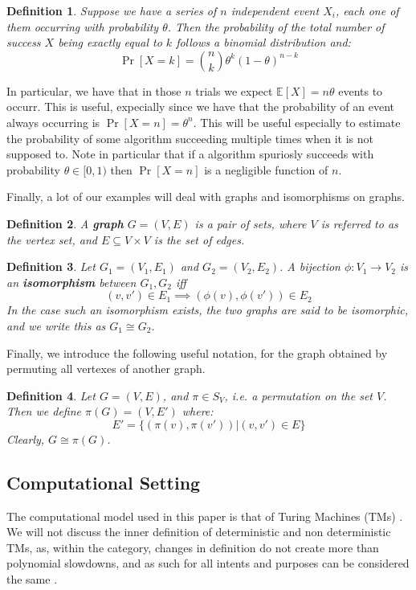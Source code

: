 \documentclass{article}
\newtheorem{definition}{Definition}
\begin{document}
\begin{definition}
    Suppose we have a series of $n$ independent event $X_i$, each one of them 
    occurring with probability $\theta$. Then the probability of the total number of success $X$ being exactly equal to $k$ follows a binomial distribution and:
    \[ \Pr[X = k] = \binom{n}{k} \theta^k (1 - \theta)^{n - k} \]
\end{definition}
In particular, we have that in those $n$ trials we expect $\mathbb{E}[X] = n\theta$ events to occurr. This is useful, expecially since 
    we have that the probability of an event always occurring is $\Pr[X = n] = \theta^n$. This will be useful especially 
    to  estimate the probability of some algorithm succeeding multiple times when it is not supposed to. 
    Note in particular that if a algorithm spuriosly succeeds with probability $\theta \in [0, 1)$ then $\Pr[X = n]$ is a 
    negligible function of $n$. \par

Finally, a lot of our examples will deal with graphs and isomorphisms on graphs.

\begin{definition}
A \textbf{graph} $G = (V, E)$ is a pair of sets, where $V$ is referred to as the vertex set, and $E \subseteq V \times V$ is the set of edges.  
\end{definition}

\begin{definition}
    Let $G_1 = (V_1, E_1)$ and $G_2 = (V_2, E_2)$. A bijection $\phi: V_1 \to V_2$ is an \textbf{isomorphism} between $G_1, G_2$ iff 
    \[ (v, v') \in E_1 \implies (\phi(v), \phi(v')) \in E_2 \] 
    In the case such an isomorphism exists, the two graphs are said to be isomorphic, and we write this as $G_1 \cong G_2$. 
\end{definition}

Finally, we introduce the following useful notation, for the graph obtained by permuting all vertexes of another graph.
\begin{definition}
    Let $G = (V, E)$, and $\pi \in S_V$, i.e. a permutation on the set $V$. Then we define $\pi(G) = (V, E')$ where:
    \[ E' = \{ (\pi(v), \pi(v')) | (v, v') \in E \} \]
    Clearly, $G \cong \pi(G)$.
\end{definition}

\subsection{Computational Setting}
The computational model used in this paper is that of Turing Machines (TMs) \cite{turingComputableNumbersApplication1937}. We will not discuss the inner definition of deterministic and non deterministic TMs, as, within the category, changes in definition do not create more than polynomial slowdowns, and as such for all intents and purposes can be considered the same \cite{aroraComputationalComplexityModern2009}. 
\end{document}
